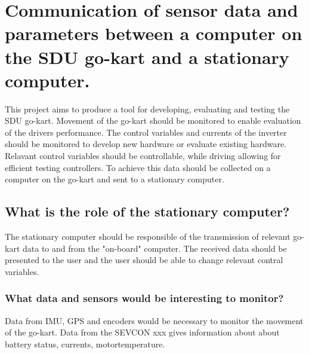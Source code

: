 
\section{Communication of sensor data and parameters between a computer on the SDU go-kart and a stationary computer.}
This project aims to produce a tool for developing, evaluating and testing the SDU go-kart.
Movement of the go-kart should be monitored to enable evaluation of the drivers performance.
The control variables and currents of the inverter should be monitored to develop new hardware or evaluate existing hardware.
Relavant control variables should be controllable, while driving allowing for efficient testing controllers.
To achieve this data should be collected on a computer on the go-kart and sent to a stationary computer.




\subsection{What is the role of the stationary computer?}
The stationary computer should be responsible of the transmission of relevant go-kart data to and from the "on-board" computer.
The received data should be presented to the user and the user should be able to change relevant contral variables.

\subsubsection*{What data and sensors would be interesting to monitor?}
Data from IMU, GPS and encoders would be necessary to monitor the movement of the go-kart.
Data from the SEVCON xxx gives information about about battery status, currents, motortemperature.

